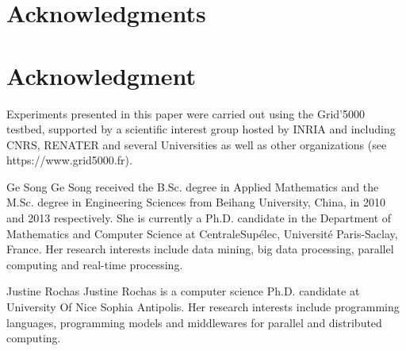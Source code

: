 \documentclass[10pt,journal,compsoc]{IEEEtran}
\begin{document}
  \section*{Acknowledgments}
\else
  \section*{Acknowledgment}
\fi
Experiments presented in this paper were carried out using the Grid'5000 testbed, supported by a scientific interest group hosted by INRIA and including CNRS, RENATER and several Universities as well as other organizations (see https://www.grid5000.fr).
\ifCLASSOPTIONcaptionsoff
  \newpage
\fi






\begin{IEEEbiography}
{Ge Song}
Ge Song received the B.Sc. degree in Applied Mathematics and the M.Sc. degree in Engineering Sciences from Beihang University, China, in 2010 and 2013 respectively. She is currently a Ph.D. candidate in the Department of Mathematics and Computer Science at  CentraleSup\'elec, Universit\'e Paris-Saclay, France. Her research interests include data mining, big data processing, parallel computing and real-time processing.
\end{IEEEbiography}

\begin{IEEEbiography}
{Justine Rochas}
Justine Rochas is a computer science Ph.D. candidate at University Of Nice Sophia Antipolis. Her research interests include programming languages, programming models and middlewares for parallel and distributed computing.
\end{IEEEbiography}
\end{document}
